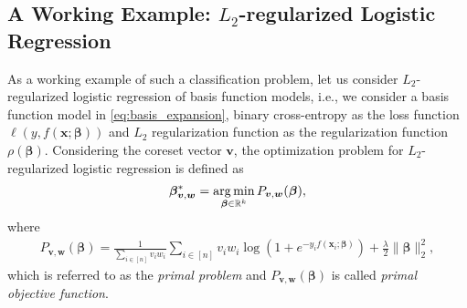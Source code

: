 \subsection{A Working Example: $L_2$-regularized Logistic Regression}
%
As a working example of such a classification problem, let us consider $L_2$-regularized logistic regression of basis function models, i.e., we consider a basis function model in \eqref{eq:basis_expansion}, binary cross-entropy as the loss function $\ell(y, f(\bm x; \bm \beta))$ and $L_2$ regularization function as the regularization function $\rho(\bm \beta)$.
%
Considering the coreset vector $\bm v$, the optimization problem for $L_2$-regularized logistic regression is defined as  
\begin{align}
\bm \beta_{\bm v, \bm w}^* = \operatorname*{arg\,min}_{\bm \beta \in \mathbb{R}^k} P_{\bm v, \bm w}(\bm \beta),
\end{align}
where  
\begin{align}
P_{\bm v, \bm w}(\bm \beta)
=
\frac{1}{\sum_{i \in [n]} v_i w_i}
\sum_{i \in [n]}
v_i w_i
\log (1 + e^{-y_i f(\bm x_i; \bm \beta)})
+
\frac{\lambda}{2} \|\bm \beta\|_2^2, 
\end{align}
which is referred to as the \emph{primal problem} and $P_{\bm v, \bm w}(\bm \beta)$ is called \emph{primal objective function}.
